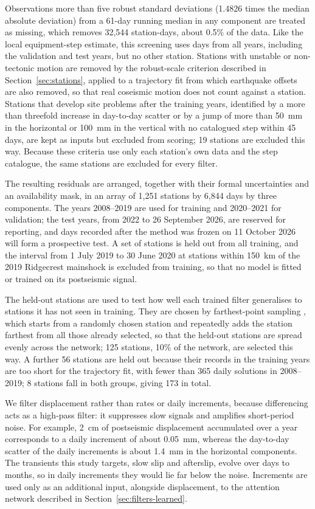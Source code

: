 \documentclass[preprint,12pt,authoryear]{elsarticle}
\begin{document}
Observations more than five robust standard deviations (1.4826 times the median absolute deviation) from a 61-day running median in any component are treated as missing, which removes 32,544 station-days, about 0.5\% of the data. Like the local equipment-step estimate, this screening uses days from all years, including the validation and test years, but no other station. Stations with unstable or non-tectonic motion are removed by the robust-scale criterion described in Section~\ref{sec:stations}, applied to a trajectory fit from which earthquake offsets are also removed, so that real coseismic motion does not count against a station. Stations that develop site problems after the training years, identified by a more than threefold increase in day-to-day scatter or by a jump of more than 50~mm in the horizontal or 100~mm in the vertical with no catalogued step within 45 days, are kept as inputs but excluded from scoring; 19 stations are excluded this way. Because these criteria use only each station's own data and the step catalogue, the same stations are excluded for every filter.

The resulting residuals are arranged, together with their formal uncertainties and an availability mask, in an array of 1,251 stations by 6,844 days by three components. The years 2008--2019 are used for training and 2020--2021 for validation; the test years, from 2022 to 26 September 2026, are reserved for reporting, and days recorded after the method was frozen on 11 October 2026 will form a prospective test. A set of stations is held out from all training, and the interval from 1 July 2019 to 30 June 2020 at stations within 150~km of the 2019 Ridgecrest mainshock is excluded from training, so that no model is fitted or trained on its postseismic signal.

The held-out stations are used to test how well each trained filter generalises to stations it has not seen in training. They are chosen by farthest-point sampling \citep{gonzalez1985}, which starts from a randomly chosen station and repeatedly adds the station farthest from all those already selected, so that the held-out stations are spread evenly across the network; 125 stations, 10\% of the network, are selected this way. A further 56 stations are held out because their records in the training years are too short for the trajectory fit, with fewer than 365 daily solutions in 2008--2019; 8 stations fall in both groups, giving 173 in total.

We filter displacement rather than rates or daily increments, because differencing acts as a high-pass filter: it suppresses slow signals and amplifies short-period noise. For example, 2~cm of postseismic displacement accumulated over a year corresponds to a daily increment of about 0.05~mm, whereas the day-to-day scatter of the daily increments is about 1.4~mm in the horizontal components. The transients this study targets, slow slip and afterslip, evolve over days to months, so in daily increments they would lie far below the noise. Increments are used only as an additional input, alongside displacement, to the attention network described in Section~\ref{sec:filters-learned}.
\end{document}
